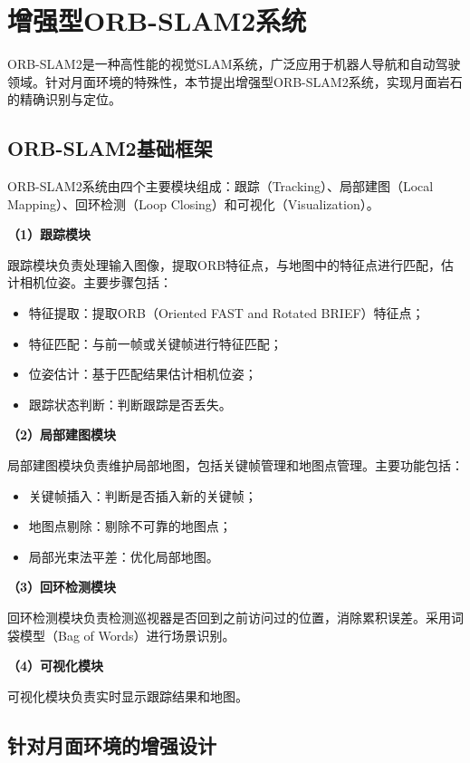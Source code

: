 \section{增强型ORB-SLAM2系统}
\label{sec:enhanced_orbslam}

ORB-SLAM2是一种高性能的视觉SLAM系统，广泛应用于机器人导航和自动驾驶领域。针对月面环境的特殊性，本节提出增强型ORB-SLAM2系统，实现月面岩石的精确识别与定位。

\subsection{ORB-SLAM2基础框架}
\label{subsec:orb_base}

ORB-SLAM2系统\cite{ref29}由四个主要模块组成：跟踪（Tracking）、局部建图（Local Mapping）、回环检测（Loop Closing）和可视化（Visualization）。

\textbf{（1）跟踪模块}

跟踪模块负责处理输入图像，提取ORB特征点，与地图中的特征点进行匹配，估计相机位姿。主要步骤包括：
\begin{itemize}
    \item 特征提取：提取ORB（Oriented FAST and Rotated BRIEF）特征点；
    \item 特征匹配：与前一帧或关键帧进行特征匹配；
    \item 位姿估计：基于匹配结果估计相机位姿；
    \item 跟踪状态判断：判断跟踪是否丢失。
\end{itemize}

\textbf{（2）局部建图模块}

局部建图模块负责维护局部地图，包括关键帧管理和地图点管理。主要功能包括：
\begin{itemize}
    \item 关键帧插入：判断是否插入新的关键帧；
    \item 地图点剔除：剔除不可靠的地图点；
    \item 局部光束法平差：优化局部地图。
\end{itemize}

\textbf{（3）回环检测模块}

回环检测模块负责检测巡视器是否回到之前访问过的位置，消除累积误差。采用词袋模型（Bag of Words）进行场景识别。

\textbf{（4）可视化模块}

可视化模块负责实时显示跟踪结果和地图。

\subsection{针对月面环境的增强设计}
\label{subsec:lunar_enhancement}

